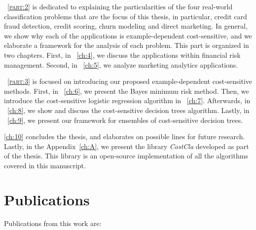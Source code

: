 \partname{~\textsc{\ref{part:2}}} is dedicated to explaining the particularities of the four 
real-world classification problems that are the focus of this thesis, in particular, credit card 
fraud detection, credit scoring, churn modeling and direct marketing. In general, we show why each 
of the applications is example-dependent cost-sensitive, and we elaborate a framework for the 
analysis of each problem. This part is organized in two chapters. First, in 
\chaptername{~\ref{ch:4}}, we discuss the applications within financial risk management. 
Second, in \chaptername{~\ref{ch:5}}, we analyze marketing analytics applications.

\partname{~\textsc{\ref{part:3}}} is focused on introducing our proposed example-dependent 
cost-sensitive methods. First, in \chaptername{~\ref{ch:6}}, we present the Bayes minimum risk 
method. Then, we introduce the cost-sensitive logistic regression algorithm in 
\chaptername{~\ref{ch:7}}. Afterwards, in \chaptername{~\ref{ch:8}}, we show and discuss the 
cost-sensitive decision trees algorithm. Lastly, in \chaptername{~\ref{ch:9}}, we present our 
framework for ensembles of cost-sensitive decision trees. 

\chaptername{ \ref{ch:10}} concludes the thesis, and elaborates on possible lines for future 
research. Lastly, in the Appendix~\ref{ch:A}, we present the library \mbox{\textit{CostCla}}  
developed as part of the thesis. This library is an open-source implementation of all the 
algorithms covered in this manuscript.

\section{Publications}

Publications from this work are:
\bigskip

